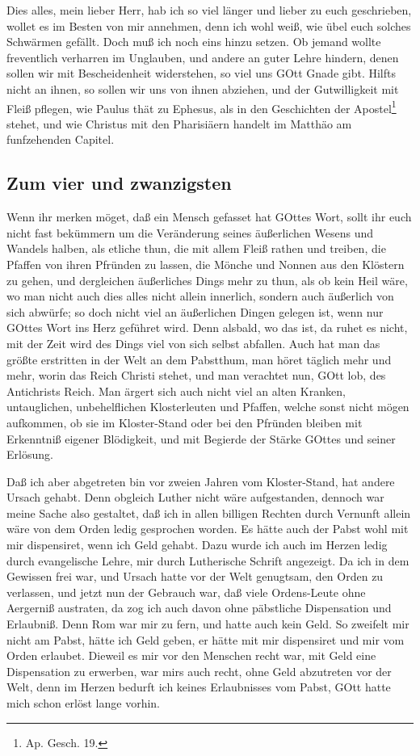 Dies alles, mein lieber Herr, hab ich so viel länger und lieber zu euch geschrieben, wollet es im Besten von mir annehmen, denn ich wohl weiß, wie übel euch solches Schwärmen gefällt. Doch muß ich noch eins hinzu setzen. Ob jemand wollte freventlich verharren im Unglauben, und andere an guter Lehre hindern, denen sollen wir mit Bescheidenheit widerstehen, so viel uns GOtt Gnade gibt. Hilfts nicht an ihnen, so sollen wir uns von ihnen abziehen, und der Gutwilligkeit mit Fleiß pflegen, wie Paulus thät zu Ephesus, als in den Geschichten der Apostel\footnote{Ap. Gesch. 19.} stehet, und wie Christus mit den Pharisiäern handelt im Matthäo am funfzehenden Capitel.

\subsection{Zum vier und zwanzigsten}

Wenn ihr merken möget, daß ein Mensch gefasset hat GOttes Wort, sollt ihr euch nicht fast bekümmern um die Veränderung seines äußerlichen Wesens und Wandels halben, als etliche thun, die mit allem Fleiß rathen und treiben, die Pfaffen von ihren Pfründen zu lassen, die Mönche und Nonnen aus den Klöstern zu gehen, und dergleichen äußerliches Dings mehr zu thun, als ob kein Heil wäre, wo man nicht auch dies alles nicht allein innerlich, sondern auch äußerlich von sich abwürfe; so doch nicht viel an äußerlichen Dingen gelegen ist, wenn nur GOttes Wort ins Herz geführet wird. Denn alsbald, wo das ist, da ruhet es nicht, mit der Zeit wird des Dings viel von sich selbst abfallen. Auch hat man das größte erstritten in der Welt an dem Pabstthum, man höret täglich mehr und mehr, worin das Reich Christi stehet, und man verachtet nun, GOtt lob, des Antichrists Reich. Man ärgert sich auch nicht viel an alten Kranken, untauglichen, unbehelflichen Klosterleuten und Pfaffen, welche sonst nicht mögen
aufkommen, ob sie im Kloster-Stand oder bei den Pfründen bleiben mit Erkenntniß eigener Blödigkeit, und mit Begierde der Stärke GOttes und seiner Erlösung.

Daß ich aber abgetreten bin vor zweien Jahren vom Kloster-Stand, hat andere Ursach gehabt. Denn obgleich Luther nicht wäre aufgestanden, dennoch war meine Sache also gestaltet, daß ich in allen billigen Rechten durch Vernunft allein wäre von dem Orden ledig gesprochen worden. Es hätte auch der Pabst wohl mit mir dispensiret, wenn ich Geld gehabt. Dazu wurde ich auch im Herzen ledig durch evangelische Lehre, mir durch Lutherische Schrift angezeigt. Da ich in dem Gewissen frei war, und Ursach hatte vor der Welt genugtsam, den Orden zu verlassen, und jetzt nun der Gebrauch war, daß viele Ordens-Leute ohne Aergerniß austraten, da zog ich auch davon ohne päbstliche Dispensation und Erlaubniß. Denn Rom war mir zu fern, und hatte auch kein Geld. So zweifelt mir nicht am Pabst, hätte ich Geld geben, er hätte mit mir dispensiret und mir vom Orden erlaubet. Dieweil es mir vor den Menschen recht war, mit Geld eine Dispensation zu erwerben, war mirs auch recht, ohne Geld abzutreten vor der Welt, denn im Herzen bedurft ich keines Erlaubnisses vom Pabst, GOtt hatte mich schon erlöst lange vorhin.

